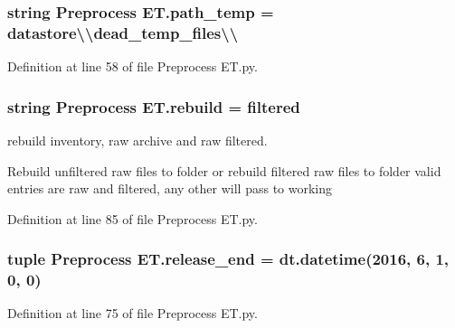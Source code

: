 \hypertarget{namespace_preprocess_01_e_t_ad821e7ccf289a1b4a0bbb7f2657bd817}{}
\subsubsection[{path\+\_\+temp}]{\setlength{\rightskip}{0pt plus 5cm}string Preprocess E\+T.\+path\+\_\+temp = \textquotesingle{}datastore\textbackslash{}\textbackslash{}dead\+\_\+temp\+\_\+files\textbackslash{}\textbackslash{}\textquotesingle{}}\label{namespace_preprocess_01_e_t_ad821e7ccf289a1b4a0bbb7f2657bd817}


Definition at line 58 of file Preprocess E\+T.\+py.

\hypertarget{namespace_preprocess_01_e_t_ab01d8bd9afb01694d081decb02687fc9}{}
\subsubsection[{rebuild}]{\setlength{\rightskip}{0pt plus 5cm}string Preprocess E\+T.\+rebuild = \textquotesingle{}filtered\textquotesingle{}}\label{namespace_preprocess_01_e_t_ab01d8bd9afb01694d081decb02687fc9}


rebuild inventory, raw archive and raw filtered. 

Rebuild unfiltered raw files to folder  or rebuild filtered raw files to folder  valid entries are \textquotesingle{}raw\textquotesingle{} and \textquotesingle{}filtered\textquotesingle{}, any other will pass to \textquotesingle{}working\textquotesingle{} 

Definition at line 85 of file Preprocess E\+T.\+py.

\hypertarget{namespace_preprocess_01_e_t_a2f7d541b022d9fd150e158ebb8b34ae1}{}
\subsubsection[{release\+\_\+end}]{\setlength{\rightskip}{0pt plus 5cm}tuple Preprocess E\+T.\+release\+\_\+end = dt.\+datetime(2016, 6, 1, 0, 0)}\label{namespace_preprocess_01_e_t_a2f7d541b022d9fd150e158ebb8b34ae1}


Definition at line 75 of file Preprocess E\+T.\+py.

